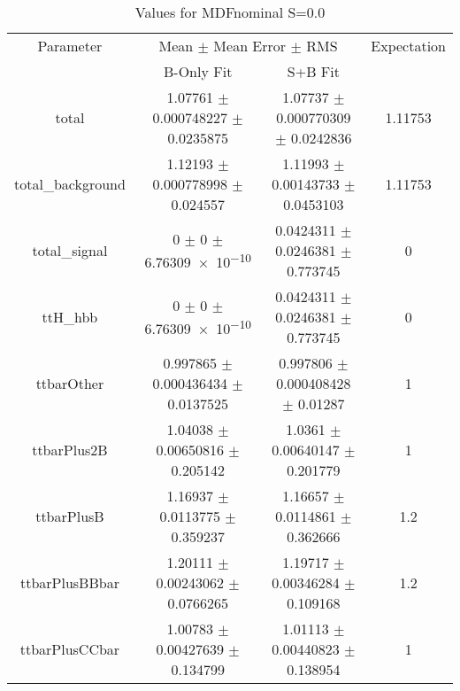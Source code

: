 \begin{table}
\centering
\caption{Values for MDFnominal S=0.0}
\begin{tabular}{cccc}
\toprule
Parameter & \multicolumn{2}{c}{Mean $\pm$ Mean Error $\pm$ RMS} & Expectation\\
 & B-Only Fit & S+B Fit & \\
\midrule
total & \num{1.07761} $\pm$ \num{0.000748227} $\pm$ \num{0.0235875} & \num{1.07737} $\pm$ \num{0.000770309} $\pm$ \num{0.0242836} & \num{1.11753}\\
total\_background & \num{1.12193} $\pm$ \num{0.000778998} $\pm$ \num{0.024557} & \num{1.11993} $\pm$ \num{0.00143733} $\pm$ \num{0.0453103} & \num{1.11753}\\
total\_signal & \num{0} $\pm$ \num{0} $\pm$ \num{6.76309e-10} & \num{0.0424311} $\pm$ \num{0.0246381} $\pm$ \num{0.773745} & \num{0}\\
ttH\_hbb & \num{0} $\pm$ \num{0} $\pm$ \num{6.76309e-10} & \num{0.0424311} $\pm$ \num{0.0246381} $\pm$ \num{0.773745} & \num{0}\\
ttbarOther & \num{0.997865} $\pm$ \num{0.000436434} $\pm$ \num{0.0137525} & \num{0.997806} $\pm$ \num{0.000408428} $\pm$ \num{0.01287} & \num{1}\\
ttbarPlus2B & \num{1.04038} $\pm$ \num{0.00650816} $\pm$ \num{0.205142} & \num{1.0361} $\pm$ \num{0.00640147} $\pm$ \num{0.201779} & \num{1}\\
ttbarPlusB & \num{1.16937} $\pm$ \num{0.0113775} $\pm$ \num{0.359237} & \num{1.16657} $\pm$ \num{0.0114861} $\pm$ \num{0.362666} & \num{1.2}\\
ttbarPlusBBbar & \num{1.20111} $\pm$ \num{0.00243062} $\pm$ \num{0.0766265} & \num{1.19717} $\pm$ \num{0.00346284} $\pm$ \num{0.109168} & \num{1.2}\\
ttbarPlusCCbar & \num{1.00783} $\pm$ \num{0.00427639} $\pm$ \num{0.134799} & \num{1.01113} $\pm$ \num{0.00440823} $\pm$ \num{0.138954} & \num{1}\\
\bottomrule
\end{tabular}
\end{table}